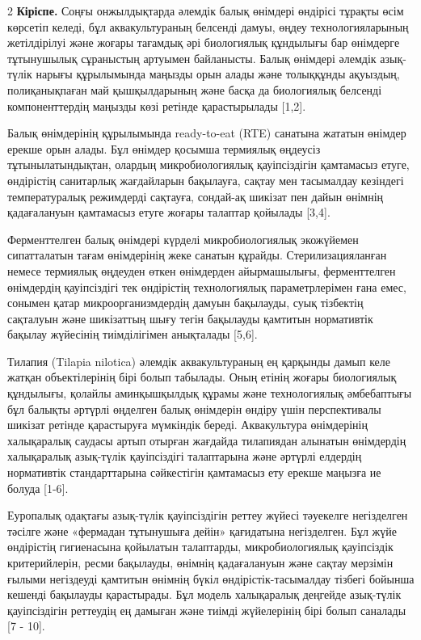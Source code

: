 \begin{multicols}{2}
{\bfseries Кіріспе.} Соңғы онжылдықтарда әлемдік балық өнімдері өндірісі
тұрақты өсім көрсетіп келеді, бұл аквакультураның белсенді дамуы, өңдеу
технологияларының жетілдірілуі және жоғары тағамдық әрі биологиялық
құндылығы бар өнімдерге тұтынушылық сұраныстың артуымен байланысты.
Балық өнімдері әлемдік азық-түлік нарығы құрылымында маңызды орын алады
және толыққұнды ақуыздың, полиқанықпаған май қышқылдарының және басқа да
биологиялық белсенді компоненттердің маңызды көзі ретінде қарастырылады
{[}1,2{]}.

Балық өнімдерінің құрылымында ready-to-eat (RTE) санатына жататын
өнімдер ерекше орын алады. Бұл өнімдер қосымша термиялық өңдеусіз
тұтынылатындықтан, олардың микробиологиялық қауіпсіздігін қамтамасыз
етуге, өндірістің санитарлық жағдайларын бақылауға, сақтау мен
тасымалдау кезіндегі температуралық режимдерді сақтауға, сондай-ақ
шикізат пен дайын өнімнің қадағалануын қамтамасыз етуге жоғары талаптар
қойылады {[}3,4{]}.

Ферменттелген балық өнімдері күрделі микробиологиялық экожүйемен
сипатталатын тағам өнімдерінің жеке санатын құрайды. Стерилизацияланған
немесе термиялық өңдеуден өткен өнімдерден айырмашылығы, ферменттелген
өнімдердің қауіпсіздігі тек өндірістің технологиялық параметрлерімен
ғана емес, сонымен қатар микроорганизмдердің дамуын бақылауды, суық
тізбектің сақталуын және шикізаттың шығу тегін бақылауды қамтитын
нормативтік бақылау жүйесінің тиімділігімен анықталады {[}5,6{]}.

Тилапия (Tilapia nilotica) әлемдік аквакультураның ең қарқынды дамып
келе жатқан объектілерінің бірі болып табылады. Оның етінің жоғары
биологиялық құндылығы, қолайлы аминқышқылдық құрамы және технологиялық
әмбебаптығы бұл балықты әртүрлі өңделген балық өнімдерін өндіру үшін
перспективалы шикізат ретінде қарастыруға мүмкіндік береді. Аквакультура
өнімдерінің халықаралық саудасы артып отырған жағдайда тилапиядан
алынатын өнімдердің халықаралық азық-түлік қауіпсіздігі талаптарына және
әртүрлі елдердің нормативтік стандарттарына сәйкестігін қамтамасыз ету
ерекше маңызға ие болуда {[}1-6{]}.

Еуропалық одақтағы азық-түлік қауіпсіздігін реттеу жүйесі тәуекелге
негізделген тәсілге және «фермадан тұтынушыға дейін» қағидатына
негізделген. Бұл жүйе өндірістің гигиенасына қойылатын талаптарды,
микробиологиялық қауіпсіздік критерийлерін, ресми бақылауды, өнімнің
қадағалануын және сақтау мерзімін ғылыми негіздеуді қамтитын өнімнің
бүкіл өндірістік-тасымалдау тізбегі бойынша кешенді бақылауды
қарастырады. Бұл модель халықаралық деңгейде азық-түлік қауіпсіздігін
реттеудің ең дамыған және тиімді жүйелерінің бірі болып саналады {[}7 -
10{]}.


\end{multicols}
